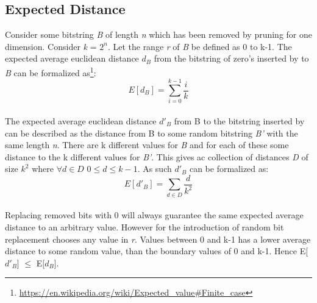 \subsection{Expected Distance}
\label{exp:dist}
Consider some bitstring \textit{B} of length \textit{n} which has been removed by \qs{} pruning for one dimension. Consider \textit{k} = $2^n$. Let the range \textit{r} of \textit{B} be defined as 0 to k-1. The expected average euclidean distance \textit{$d_B$} from the bitstring of zero's inserted by \qs{} to \textit{B} can be formalized as\footnote{\url{https://en.wikipedia.org/wiki/Expected_value\#Finite_case}}:
\\
$$E[\textit{$d_B$}] = \sum_{i=0}^{k - 1} \dfrac{i}{k}$$
\\
The expected average euclidean distance \textit{$d'_B$} from B to the bitstring inserted by \qsr{} can be described as the distance from B to some random bitstring \textit{B'} with the same length \textit{n}. There are k different values for \textit{B} and for each of these some distance to the k different values for \textit{B'}. This gives ac collection of distances \textit{D} of size $k^2$ where $\forall{}\textit{d}\in{}\textit{D}$ $0\leq{}d\leq{}k-1$. As such \textit{$d'_B$} can be formalized as:
\\
$$E[\textit{$d'_B$}] = \sum_{d\in\textit{D}}^{}\dfrac{d}{k^2}$$
\\
Replacing removed bits with 0 will always guarantee the same expected average distance to an arbitrary value. However for \qsr{} the introduction of random bit replacement chooses any value in \textit{r}. Values between 0 and k-1 has a lower average distance to some random value, than the boundary values of 0 and k-1. Hence E[\textit{$d'_B$}] $\leq{}$ E[\textit{$d_B$}].